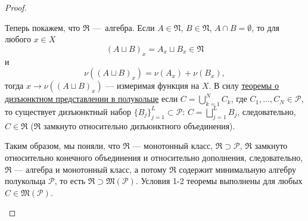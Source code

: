 \begin{proof}
\begin{enumerate}
        Теперь покажем, что $\mathfrak{R}$ — алгебра.
        Если $A \in \mathfrak{N}$, $B \in \mathfrak{N}$, $A \cap B = \emptyset$, то для любого $x \in X$
        \[(A \sqcup B)_x = A_x \sqcup B_x \in \mathfrak{N}\]
        и
        \[\nu((A \sqcup B)_x) = \nu(A_x) + \nu(B_x),\]
        тогда
        $x \to \nu((A \sqcup B)_x)$ — измеримая функция на $X$.
        В силу \hyperref[th:1.2]{теоремы о дизъюнктном представлении в полукольце} если $C = \bigcup\limits_{k=1}^{N} C_k$, где $C_1, \dots, C_N \in \mathcal{P}$, то существует дизъюнктный набор $\{B_j\}_{j=1}^L \subset \mathcal{P}$: $C = \bigsqcup\limits_{j=1}^{L}B_j$, следовательно, $C \in \mathfrak{R}$ ($\mathfrak{R}$ замкнуто относительно дизъюнктного объединения).

        Таким образом, мы поняли, что $\mathfrak{R}$ — монотонный класс, $\mathfrak{R} \supset \mathcal{P}$, $\mathfrak{R}$ замкнуто относительно конечного объединения и относительно дополнения, следовательно, $\mathfrak{R}$ — алгебра и монотонный класс, а потому $\mathfrak{R}$ содержит минимальную алгебру полукольца $\mathcal{P}$, то есть $\mathfrak{R} \supset \mathfrak{M}(\mathcal{P})$.
        Условия 1-2 теоремы выполнены для любых $C \in \mathfrak{M}(\mathcal{P})$.


\end{enumerate}
\end{proof}

